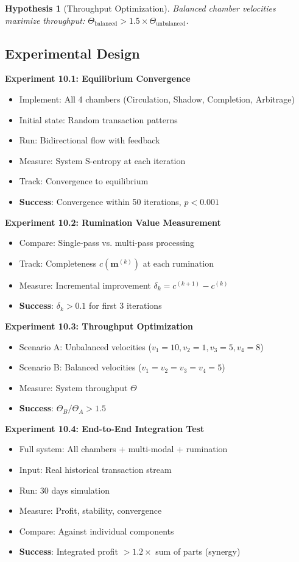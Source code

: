 \documentclass[12pt]{article}
\newtheorem{hypothesis}{Hypothesis}
\begin{document}
\begin{hypothesis}[Throughput Optimization]
Balanced chamber velocities maximize throughput: $\Theta_{\text{balanced}} > 1.5 \times \Theta_{\text{unbalanced}}$.
\end{hypothesis}

\subsection{Experimental Design}

\textbf{Experiment 10.1: Equilibrium Convergence}
\begin{itemize}
    \item Implement: All 4 chambers (Circulation, Shadow, Completion, Arbitrage)
    \item Initial state: Random transaction patterns
    \item Run: Bidirectional flow with feedback
    \item Measure: System S-entropy at each iteration
    \item Track: Convergence to equilibrium
    \item \textbf{Success}: Convergence within 50 iterations, $p < 0.001$
\end{itemize}

\textbf{Experiment 10.2: Rumination Value Measurement}
\begin{itemize}
    \item Compare: Single-pass vs. multi-pass processing
    \item Track: Completeness $c(\mathbf{m}^{(k)})$ at each rumination
    \item Measure: Incremental improvement $\delta_k = c^{(k+1)} - c^{(k)}$
    \item \textbf{Success}: $\delta_k > 0.1$ for first 3 iterations
\end{itemize}

\textbf{Experiment 10.3: Throughput Optimization}
\begin{itemize}
    \item Scenario A: Unbalanced velocities ($v_1=10, v_2=1, v_3=5, v_4=8$)
    \item Scenario B: Balanced velocities ($v_1=v_2=v_3=v_4=5$)
    \item Measure: System throughput $\Theta$
    \item \textbf{Success}: $\Theta_B / \Theta_A > 1.5$
\end{itemize}

\textbf{Experiment 10.4: End-to-End Integration Test}
\begin{itemize}
    \item Full system: All chambers + multi-modal + rumination
    \item Input: Real historical transaction stream
    \item Run: 30 days simulation
    \item Measure: Profit, stability, convergence
    \item Compare: Against individual components
    \item \textbf{Success}: Integrated profit $> 1.2 \times$ sum of parts (synergy)
\end{itemize}
\end{document}
